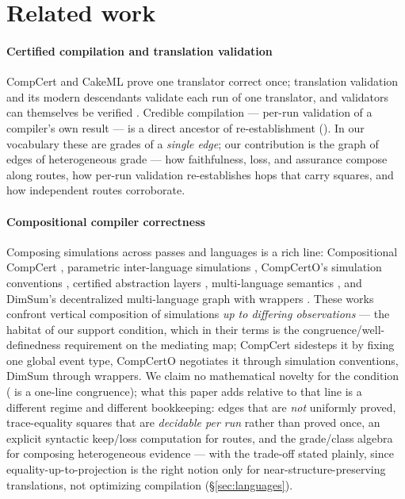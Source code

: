 \section{Related work}
\label{sec:related}

\paragraph{Certified compilation and translation validation}
CompCert \citep{leroy2009compcert} and CakeML \citep{kumar2014cakeml}
prove one translator correct once; translation validation
\citep{pnueli1998tv,necula2000tv} and its modern descendants
\citep{lopes2021alive2,sewell2013tv} validate each run of one
translator, and validators can themselves be verified
\citep{tristan2008tv}. Credible compilation \citep{rinard1999credible}
--- per-run validation of a compiler's own result --- is a direct
ancestor of re-establishment (). In our
vocabulary these are grades of a \emph{single edge}; our contribution
is the graph of edges of heterogeneous grade --- how faithfulness,
loss, and assurance compose along routes, how per-run validation
re-establishes hops that carry squares, and how independent routes
corroborate.

\paragraph{Compositional compiler correctness}
Composing simulations across passes and languages is a rich line:
Compositional CompCert \citep{stewart2015compcomp}, parametric
inter-language simulations \citep{neis2015pilsner}, CompCertO's
simulation conventions \citep{koenig2021compcerto}, certified
abstraction layers \citep{gu2015cal}, multi-language semantics
\citep{matthews2007multi,perconti2014open}, and DimSum's decentralized
multi-language graph with wrappers \citep{sammler2023dimsum}. These
works confront vertical composition of simulations \emph{up to
differing observations} --- the habitat of our support condition, which
in their terms is the congruence/well-definedness requirement on the
mediating map; CompCert sidesteps it by fixing one global event type,
CompCertO negotiates it through simulation conventions, DimSum through
wrappers. We claim no mathematical novelty for the condition
( is a one-line congruence); what this paper adds
relative to that line is a different regime and different bookkeeping:
edges that are \emph{not} uniformly proved, trace-equality squares that
are \emph{decidable per run} rather than proved once, an explicit
syntactic keep/loss computation for routes, and the grade/class algebra
for composing heterogeneous evidence --- with the trade-off stated
plainly, since equality-up-to-projection is the right notion only for
near-structure-preserving translations, not optimizing compilation
(\S\ref{sec:languages}).

